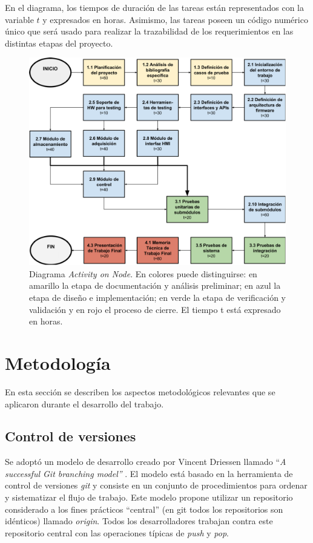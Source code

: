En el diagrama, los tiempos de duración de las tareas están representados con la variable $t$ y expresados en horas. Asimismo, las tareas poseen un código numérico único que será usado para realizar la trazabilidad de los requerimientos en las distintas etapas del proyecto.

\begin{figure}[ht]
	\centering
	\includegraphics[width=\textwidth]{./Figures/AoN.pdf}
	\caption[Diagrama \textit{Activity on Node}.]{Diagrama \textit{Activity on Node}.  En colores puede distinguirse: en amarillo la etapa de documentación y análisis preliminar; en azul la etapa de diseño e implementación; en verde la etapa de verificación y validación y en rojo el proceso de cierre. El tiempo t está expresado en horas.}
	\label{fig:AoN}
\end{figure}

\clearpage
\section{Metodología}

En esta sección se describen los aspectos metodológicos relevantes que se aplicaron durante el desarrollo del trabajo.  

\subsection{Control de versiones}
\label{subsec:branching}

Se adoptó un modelo de desarrollo creado por Vincent Driessen llamado ``\textit{A successful Git branching model''} \citep{Driessen}.  El modelo está basado en la herramienta de control de versiones \textit{git} y consiste en un conjunto de procedimientos para ordenar y sistematizar el flujo de trabajo. Este modelo propone utilizar un repositorio considerado a los fines prácticos ``central'' (en git todos los repositorios son idénticos) llamado \textit{origin}.  Todos los desarrolladores trabajan contra este repositorio central con las operaciones típicas de \textit{push} y \textit{pop}.  

